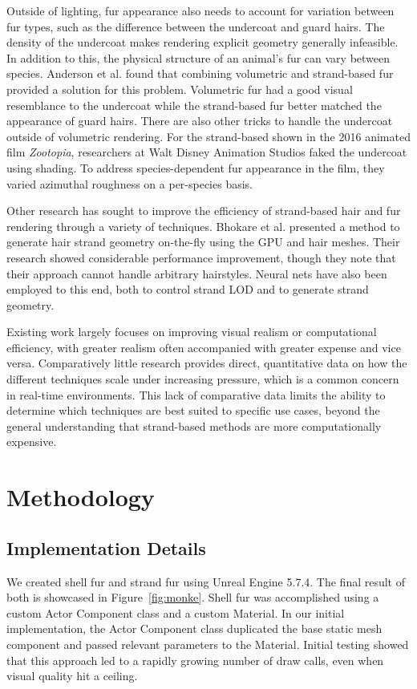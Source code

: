 \documentclass{article}
\begin{document}
Outside of lighting, fur appearance also needs to account for variation between fur types, such as the difference between the undercoat and guard hairs\cite{andersen2016hybrid}. The density of the undercoat makes rendering explicit geometry generally infeasible\cite{chiang}. In addition to this, the physical structure of an animal's fur can vary between species\cite{chiang}. Anderson et al. found that combining volumetric and strand-based fur provided a solution for this problem. Volumetric fur had a good visual resemblance to the undercoat while the strand-based fur better matched the appearance of guard hairs\cite{andersen2016hybrid}. There are also other tricks to handle the undercoat outside of volumetric rendering. For the strand-based shown in the 2016 animated film \textit{Zootopia}, researchers at Walt Disney Animation Studios faked the undercoat using shading\cite{chiang}. To address species-dependent fur appearance in the film, they varied azimuthal roughness on a per-species basis.

Other research has sought to improve the efficiency of strand-based hair and fur rendering through a variety of techniques. Bhokare et al. presented a method to generate hair strand geometry on-the-fly using the GPU and hair meshes\cite{bhokare}. Their research showed considerable performance improvement, though they note that their approach cannot handle arbitrary hairstyles. Neural nets have also been employed to this end, both to control strand LOD and to generate strand geometry\cite{wei,zhu}.

Existing work largely focuses on improving visual realism or computational efficiency, with greater realism often accompanied with greater expense and vice versa. Comparatively little research provides direct, quantitative data on how the different techniques scale under increasing pressure, which is a common concern in real-time environments. This lack of comparative data limits the ability to determine which techniques are best suited to specific use cases, beyond the general understanding that strand-based methods are more computationally expensive.

\section{Methodology}

\subsection{Implementation Details}
We created shell fur and strand fur using Unreal Engine 5.7.4. The final result of both is showcased in Figure~\ref{fig:monke}. Shell fur was accomplished using a custom Actor Component class and a custom Material. In our initial implementation, the Actor Component class duplicated the base static mesh component and passed relevant parameters to the Material. Initial testing showed that this approach led to a rapidly growing number of draw calls, even when visual quality hit a ceiling.
\end{document}
